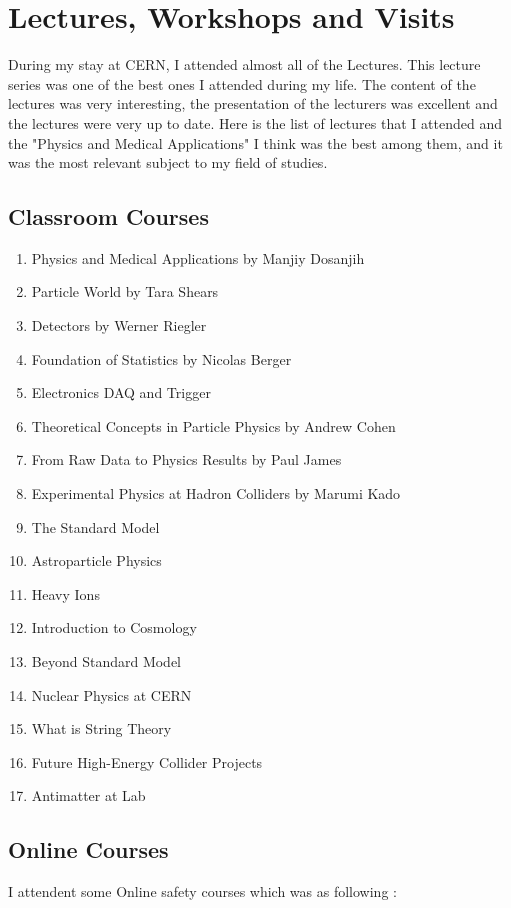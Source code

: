 \documentclass[12pt,a4paper]{article}
\begin{document}
\section{Lectures, Workshops and Visits}
During my stay at CERN, I attended almost all of the Lectures. This lecture series was one of the best ones I attended during my life. The content of the lectures was very interesting, the presentation of the lecturers was excellent and the lectures were very up to date. Here is the list of lectures that I attended and the "Physics and Medical Applications" I think was the best among them, and it was the most relevant subject to my field of studies.
\subsection{Classroom Courses}

\begin{enumerate}

\item Physics and Medical Applications by Manjiy Dosanjih
\item Particle World by Tara Shears
\item Detectors by Werner Riegler
\item Foundation of Statistics by Nicolas Berger
\item Electronics DAQ and Trigger
\item Theoretical Concepts in Particle Physics by Andrew Cohen
\item From Raw Data to Physics Results by Paul James
\item Experimental Physics at Hadron Colliders by Marumi Kado
\item The Standard Model
\item Astroparticle Physics
\item Heavy Ions
\item Introduction to Cosmology
\item Beyond Standard Model
\item Nuclear Physics at CERN
\item What is String Theory
\item Future High-Energy Collider Projects
\item Antimatter at Lab

\end{enumerate}


\subsection{Online Courses}
I attendent some Online safety courses which was as following :
\end{document}
